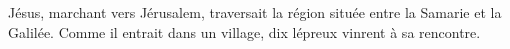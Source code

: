 \encetemps Jésus, marchant vers Jérusalem,
		traversait la région située entre la Samarie et la Galilée.
Comme il entrait dans un village, dix lépreux vinrent à sa rencontre.
